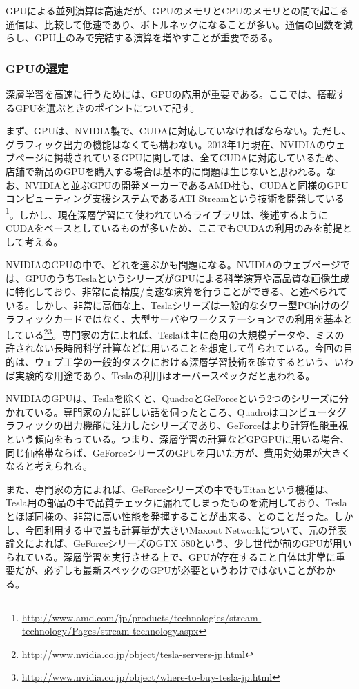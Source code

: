 GPUによる並列演算は高速だが、GPUのメモリとCPUのメモリとの間で起こる通信は、比較して低速であり、ボトルネックになることが多い。通信の回数を減らし、GPU上のみで完結する演算を増やすことが重要である\cite{bengio2012practical}。

\subsubsection{GPUの選定}
深層学習を高速に行うためには、GPUの応用が重要である。ここでは、搭載するGPUを選ぶときのポイントについて記す。\par
まず、GPUは、NVIDIA製で、CUDAに対応していなければならない。ただし、グラフィック出力の機能はなくても構わない。2013年1月現在、NVIDIAのウェブページに掲載されているGPUに関しては、全てCUDAに対応しているため、店舗で新品のGPUを購入する場合は基本的に問題は生じないと思われる。なお、NVIDIAと並ぶGPUの開発メーカーであるAMD社も、CUDAと同様のGPUコンピューティング支援システムであるATI Streamという技術を開発している\footnote{\url{http://www.amd.com/jp/products/technologies/stream-technology/Pages/stream-technology.aspx}}。しかし、現在深層学習にて使われているライブラリは、後述するようにCUDAをベースとしているものが多いため、ここでもCUDAの利用のみを前提として考える。\par
NVIDIAのGPUの中で、どれを選ぶかも問題になる。NVIDIAのウェブページでは、GPUのうちTeslaというシリーズがGPUによる科学演算や高品質な画像生成に特化しており、非常に高精度/高速な演算を行うことができる、と述べられている。しかし、非常に高価な上、Teslaシリーズは一般的なタワー型PC向けのグラフィックカードではなく、大型サーバやワークステーションでの利用を基本としている\footnote{\url{http://www.nvidia.co.jp/object/tesla-servers-jp.html}}\footnote{\url{http://www.nvidia.co.jp/object/where-to-buy-tesla-jp.html}}。専門家の方によれば、Teslaは主に商用の大規模データや、ミスの許されない長時間科学計算などに用いることを想定して作られている。今回の目的は、ウェブ工学の一般的タスクにおける深層学習技術を確立するという、いわば実験的な用途であり、Teslaの利用はオーバースペックだと思われる。\par
NVIDIAのGPUは、Teslaを除くと、QuadroとGeForceという2つのシリーズに分かれている。専門家の方に詳しい話を伺ったところ、Quadroはコンピュータグラフィックの出力機能に注力したシリーズであり、GeForceはより計算性能重視という傾向をもっている。つまり、深層学習の計算などGPGPUに用いる場合、同じ価格帯ならば、GeForceシリーズのGPUを用いた方が、費用対効果が大きくなると考えられる。\par
また、専門家の方によれば、GeForceシリーズの中でもTitanという機種は、Tesla用の部品の中で品質チェックに漏れてしまったものを流用しており、Teslaとほぼ同様の、非常に高い性能を発揮することが出来る、とのことだった。しかし、今回利用する中で最も計算量が大きいMaxout Networkについて、元の発表論文によれば、GeForceシリーズのGTX 580という、少し世代が前のGPUが用いられている。深層学習を実行させる上で、GPUが存在すること自体は非常に重要だが、必ずしも最新スペックのGPUが必要というわけではないことがわかる。


